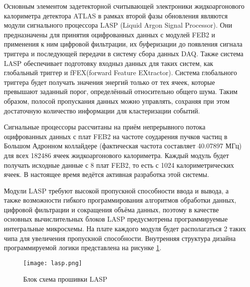 Основным элементом задетекторной считывающей электроники жидкоаргонового калориметра детектора ATLAS в рамках второй фазы обновления являются модули сигнального процессора LASP (Liquid Argon Signal Processor). Они предназначены для принятия оцифрованных данных с модулей FEB2 и применения к ним цифровой фильтрации, их буферизации до появления сигнала триггера и последующей передачи в систему сбора данных DAQ. Также система LASP обеспечивает подготовку входныз данных для таких систем, как глобальный триггер и fFEX(forward Feature EXtractor). Система глобального триггера будет получать значения энергий только от тех ячеек, которые превышают заданный порог, определённый относительно общего шума. Таким образом, полосой пропускания данных можно управлять, сохраняя при этом достаточную количество информации для кластеризации событий.\par
Сигнальные процессоры рассчитаны на приём непрерывного потока оцифрованных данных с плат FEB2 на частоте соударения пучков частиц в Большом Адронном коллайдере (фактическая частота составляет 40.07897 МГц) для всех 182486 ячеек жидкоаргонового калориметра. Каждый модуль будет получать исходные данные с 8 плат FEB2, то есть с 1024 калориметрических ячеек. В настоящее время ведётся активная разработка этой системы.\par
Модули LASP требуют высокой пропускной способности ввода и вывода, а также возможности гибкого программирования алгоритмов обработки данных, цифровой фильтрации и сокращения объёма данных, поэтому в качестве основных вычислительных блоков LASP предусмотрены программируемые интегральные микросхемы. На плате каждого модуля будет располагаться 2 таких чипа для увеличения пропускной способности. Внутренняя структура дизайна программируемой логики представлена на рисунке \ref{fig:lasp}.

\begin{figure}[ht]
    \centering
    \texttt{[image: lasp.png]}
    \caption{Блок схема прошивки LASP}
    \label{fig:lasp}
\end{figure}\par

